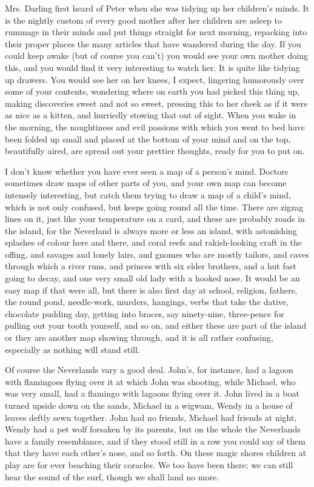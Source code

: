 Mrs. Darling first heard of Peter when she was tidying up her children's
minds. It is the nightly custom of every good mother after her children
are asleep to rummage in their minds and put things straight for next
morning, repacking into their proper places the many articles that have
wandered during the day. If you could keep awake (but of course you can't)
you would see your own mother doing this, and you would find it very
interesting to watch her. It is quite like tidying up drawers. You would
see her on her knees, I expect, lingering humorously over some of your
contents, wondering where on earth you had picked this thing up, making
discoveries sweet and not so sweet, pressing this to her cheek as if it
were as nice as a kitten, and hurriedly stowing that out of sight. When
you wake in the morning, the naughtiness and evil passions with which you
went to bed have been folded up small and placed at the bottom of your
mind and on the top, beautifully aired, are spread out your prettier
thoughts, ready for you to put on.


I don't know whether you have ever seen a map of a person's mind. Doctors
sometimes draw maps of other parts of you, and your own map can become
intensely interesting, but catch them trying to draw a map of a child's
mind, which is not only confused, but keeps going round all the time.
There are zigzag lines on it, just like your temperature on a card, and
these are probably roads in the island, for the Neverland is always more
or less an island, with astonishing splashes of colour here and there, and
coral reefs and rakish-looking craft in the offing, and savages and lonely
lairs, and gnomes who are mostly tailors, and caves through which a river
runs, and princes with six elder brothers, and a hut fast going to decay,
and one very small old lady with a hooked nose. It would be an easy map if
that were all, but there is also first day at school, religion, fathers,
the round pond, needle-work, murders, hangings, verbs that take the
dative, chocolate pudding day, getting into braces, say ninety-nine,
three-pence for pulling out your tooth yourself, and so on, and either
these are part of the island or they are another map showing through, and
it is all rather confusing, especially as nothing will stand still.


Of course the Neverlands vary a good deal. John's, for instance, had a
lagoon with flamingoes flying over it at which John was shooting, while
Michael, who was very small, had a flamingo with lagoons flying over it.
John lived in a boat turned upside down on the sands, Michael in a wigwam,
Wendy in a house of leaves deftly sewn together. John had no friends,
Michael had friends at night, Wendy had a pet wolf forsaken by its
parents, but on the whole the Neverlands have a family resemblance, and if
they stood still in a row you could say of them that they have each
other's nose, and so forth. On these magic shores children at play are for
ever beaching their coracles. We too have been there; we can
still hear the sound of the surf, though we shall land no more.


